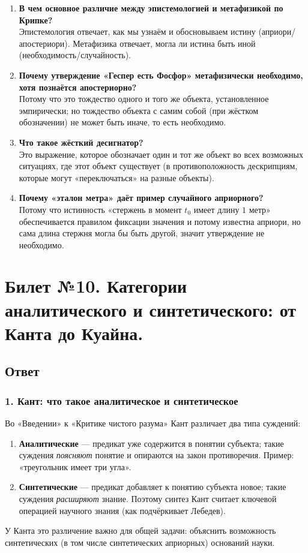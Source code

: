 \documentclass[a4paper,12pt]{article}
\begin{document}
\begin{enumerate}
    \item \textbf{В чем основное различие между эпистемологией и метафизикой по Крипке?}\\
    Эпистемология отвечает, как мы узнаём и обосновываем истину (априори/апостериори). Метафизика отвечает, могла ли истина быть иной (необходимость/случайность).
    \item \textbf{Почему утверждение «Геспер есть Фосфор» метафизически необходимо, хотя познаётся апостериорно?}\\
    Потому что это тождество одного и того же объекта, установленное эмпирически; но тождество объекта с самим собой (при жёстком обозначении) не может быть иначе, то есть необходимо.
    \item \textbf{Что такое жёсткий десигнатор?}\\
    Это выражение, которое обозначает один и тот же объект во всех возможных ситуациях, где этот объект существует (в противоположность дескрипциям, которые могут «переключаться» на разные объекты).
    \item \textbf{Почему «эталон метра» даёт пример случайного априорного?}\\
    Потому что истинность «стержень в момент $t_0$ имеет длину $1$ метр» обеспечивается правилом фиксации значения и потому известна априори, но сама длина стержня могла бы быть другой, значит утверждение не необходимо.
\end{enumerate}

\newpage
\section{Билет №10. Категории аналитического и синтетического: от Канта до Куайна.}

\subsection{Ответ}

\subsubsection*{1. Кант: что такое аналитическое и синтетическое}

Во «Введении» к «Критике чистого разума» Кант различает два типа суждений:
\begin{enumerate}
    \item \textbf{Аналитические} — предикат уже содержится в понятии субъекта; такие суждения \emph{поясняют} понятие и опираются на закон противоречия. Пример: «треугольник имеет три угла».
    \item \textbf{Синтетические} — предикат добавляет к понятию субъекта новое; такие суждения \emph{расширяют} знание. Поэтому синтез Кант считает ключевой операцией научного знания (как подчёркивает Лебедев).
\end{enumerate}
У Канта это различение важно для общей задачи: объяснить возможность синтетических (в том числе синтетических априорных) оснований науки.
\end{document}
